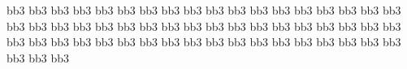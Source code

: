 \grg\bstst bb3{\bNp\grd}{\bN\gre}{\bNp\grd}\bb\enotes\xbarre
\notes\grg\bstst bb3{\bNp\grd}{\bN\gre}{\bNp\grd}\bb\etn
\dbld\bstst bb3\bdp{\bb\dble}\bep\bc\enotes\suspmorceau
%
\reprmorceau
\notes\grg\bcst bb3{\ba\taor}\bap\bd\etn
\grg\btsst bb3\bc{\bep\grg}{\bap\grd}\bc\enotes\xbarre
\notes\dble\bstst bb3\bep{\ba\grg}\bfp\ba\etn
\dble\bcst bb3{\be\grg}\bdp\bc\enotes\xbarre
\notes\grg\btsst bb3\bb{\bdp\gre}{\bNp\grd}\bb\etn
\grh\bstst bb3\bgp{\bf\grg}\bep\bd\enotes\xbarre
\notes\dblc\bcc bb3{\bc\gre}\ba\etn
\wbirl\ca\enotes\setrightrepeat\suspmorceau
%
\reprmorceau
\leftrepeatsymbol
\notes\grg\bst bb3\bep\bd\enotes\xbarre
\notes\grg\btsst bb3\bc\bep\bhp\be\etn
\dblg\bstc bb3\bgp{\be\dblh}\bh\enotes\xbarre
\notes\btsst bb3\bc\bep\bhp\bg\etn
\grh\bstst bb3\bfp{\be\grg}\bdp\bc\enotes\xbarre
\notes\scatchb\bcst bb3{\bb\dblg}\bgp\bb\etn
\bstc bb3\bhp{\bb\dblg}\bg\enotes\xbarre
\notes\tcatchb\bcc bb3{\bb\dblg}\bg\etn
\bstst bb3\bhp{\bg\grh}\bfp\bd\enotes\suspmorceau
%
\reprmorceau
\notes\grg\btsc bb3\bc{\bep\dblh}\bh\etn
\btsc bb3{\bg\grh}{\bep\dblh}\bh\enotes\xbarre
\notes\bstst bb3\bgp{\be\grg}\bfp\bd\etn
\dble\bcst bb3{\be\grg}\bdp\bc\enotes\xbarre
\notes\grg\btsst bb3\bb{\bdp\gre}{\bNp\grd}\bb\etn
\grh\bstst bb3\bgp{\bf\grg}\bep\bd\enotes\xbarre
\notes\dblc\bcc bb3{\bc\gre}\ba\etn
\wbirl\ca\enotes\setrightrepeat\suspmorceau
%
\reprmorceau
\leftrepeatsymbol
\notes\ce\enotes\xbarre
\notes\dble\bstts bb3\bep{\ba\grg}\bc\bep\etn
\grg\bstts bb3\bep{\ba\grg}{\bc\grd}\bap\enotes\xbarre
\notes\dble\bstts bb3\bep{\ba\grg}\bc\bep\etn
\grg\bstst bb3\bfp{\be\grg}\bdp\bc\enotes\xbarre
\notes\dbld\bstts bb3\bdp{\bN\grg}\bb\bdp\etn
\grg\bstts bb3\bdp{\bN\grg}{\bb\grd}\bNp\enotes\xbarre
\notes\dbld\bstts bb3\bdp{\bN\grg}\bb\bep\etn
\thrwd\bcst bb3{\bd\dblc}\bcp\bb\enotes\suspmorceau
%
\reprmorceau
\notes\dble\bstts bb3\bep{\ba\grg}\bc\bep\etn
\grg\bstts bb3\bep{\ba\grg}{\bc\grd}\bap\enotes\xbarre
\notes\dble\bstts bb3\bep{\ba\grg}\bc\bep\etn
\grg\bstst bb3\bfp{\be\grg}\bdp\bc\enotes\xbarre
\notes\grg\btsst bb3\bb{\bdp\gre}{\bNp\grd}\bb\etn
\grh\bstst bb3\bgp{\bf\grg}\bep\bd\enotes\xbarre
\notes\dblc\bcc bb3{\bc\gre}\ba\etn
\wbirl\ca\enotes\setrightrepeat\suspmorceau
%
\reprmorceau
\leftrepeatsymbol
\notes\ce\enotes\xbarre
\notes\bstts bb3\bhp{\be\grg}\bc\bep\etn
\dble\bstts bb3\bep{\ba\grg}{\bc\grd}\bap\enotes\xbarre
\notes\bstts bb3\bhp{\be\grg}\bc\bep\etn
\grg\bstst bb3\bfp{\be\grg}\bdp\bc\enotes\xbarre
\notes\grh\bstts bb3\bgp{\bd\grg}\bb\bdp\etn
\dbld\bstts bb3\bdp{\bN\grg}{\bb\grd}\bNp\enotes\xbarre
\notes\grh\bstts bb3\bgp{\bd\grg}\bb\bep\etn
\thrwd\bcst bb3{\bd\dblc}\bcp\bb\enotes\suspmorceau
%
\reprmorceau
\notes\bstts bb3\bhp{\be\grg}\bc\bep\etn
\dble\bstts bb3\bep{\ba\grg}{\bc\grd}\bap\enotes\xbarre
\notes{}\bstts bb3\bhp{\be\grg}\bc\bep\rlap{\fsk\Uptext{$\vert$}}\etn
{}\bcst bb3{\bh\grip}\bhp\bg\rlap{\fsk\Uptext{$\vert$}}\etn
\grg\bstst bb3\bfp{\be\grg}\bdp\bc\enotes\xbarre
\notes\grg\btsst bb3\bb{\bdp\gre}{\bNp\grd}\bb\etn
\grh\bstst bb3\bgp{\bf\grg}\bep\bd\enotes\xbarre
\notes\dblc\bcc bb3{\bc\gre}\ba\etn
\wbirl\ca\enotes\setrightrepeat\suspmorceau\byemedley
\bye
